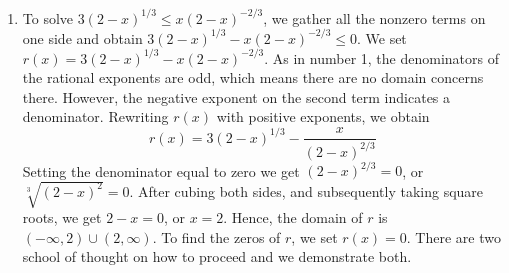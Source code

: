 {\begin{enumerate}

As a point of interest, if we take a closer look at the graphs of $f$ and $g$  near $x=0$ with the axes off, we see in Figure \ref{fig:algfun10} that despite the fact they both involve cube roots, they exhibit different behaviour near $x=0$.  The graph of $f$ has a sharp turn, or cusp, while $g$ does not. (Recall that we introduced this feature on page \pageref{cusppicture} as a feature which makes the graph of a function `not smooth'.)




\item  To solve $3 (2-x)^{1/3} \leq x (2-x)^{-2/3}$, we gather all the nonzero terms on one side and obtain $3 (2-x)^{1/3} - x (2-x)^{-2/3} \leq 0$. We set $r(x) = 3 (2-x)^{1/3} - x (2-x)^{-2/3}$.  As in number 1, the denominators of the rational exponents are odd, which means there are no domain concerns there.  However, the negative exponent on the second term indicates a denominator.  Rewriting $r(x)$ with positive exponents, we obtain \[r(x) =  3 (2-x)^{1/3} - \frac{x}{(2-x)^{2/3}}\]  Setting the denominator equal to zero we get $(2-x)^{2/3} = 0$, or $\sqrt[3]{(2-x)^2} = 0$.  After cubing both sides, and subsequently taking square roots, we get $2-x=0$, or $x=2$.  Hence, the domain of $r$ is $(-\infty, 2) \cup (2, \infty)$. To find the zeros of $r$, we set $r(x) = 0$.  There are two school of thought on how to proceed and we demonstrate both.


\end{enumerate}}
